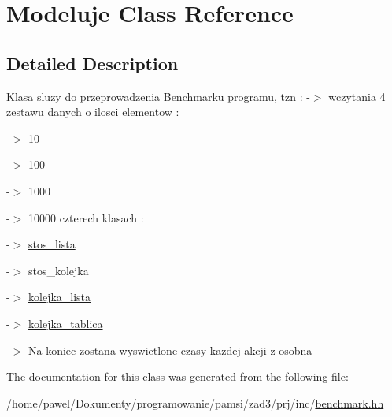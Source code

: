 \hypertarget{class_modeluje}{\section{Modeluje Class Reference}
\label{class_modeluje}
}


\subsection{Detailed Description}
Klasa sluzy do przeprowadzenia Benchmarku programu, tzn \-: -\/$>$ wczytania 4 zestawu danych o ilosci elementow \-: \par
-\/$>$ 10 \par
-\/$>$ 100 \par
-\/$>$ 1000 \par
-\/$>$ 10000  czterech klasach \-: \par
 -\/$>$ \hyperlink{classstos__lista}{stos\-\_\-lista} \par
 -\/$>$ stos\-\_\-kolejka \par
 -\/$>$ \hyperlink{classkolejka__lista}{kolejka\-\_\-lista} \par
 -\/$>$ \hyperlink{classkolejka__tablica}{kolejka\-\_\-tablica} \par
-\/$>$ Na koniec zostana wyswietlone czasy kazdej akcji z osobna 

The documentation for this class was generated from the following file\-:\begin{DoxyCompactItemize}
\item 
/home/pawel/\-Dokumenty/programowanie/pamsi/zad3/prj/inc/\hyperlink{benchmark_8hh}{benchmark.\-hh}\end{DoxyCompactItemize}
